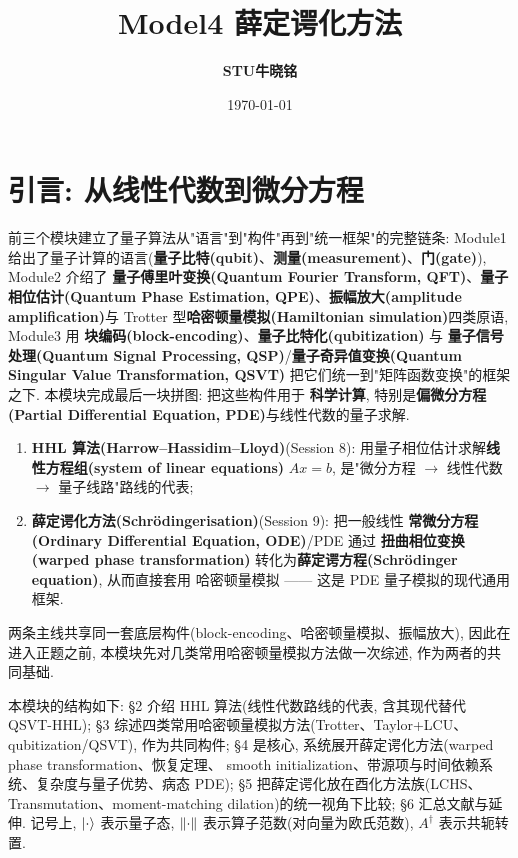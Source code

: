 \documentclass[utf8]{article} %
\title{\textbf{Model4 薛定谔化方法}}
\date{\today}
\author{\textbf{STU\quad 牛晓铭}}
\numberwithin{equation}{section}   %
\newtheorem{Note}{\hskip 2em {\color{red} 注}}[subsection]
\begin{document}
  
\maketitle
\renewcommand{\contentsname}{} 
\tableofcontents
\thispagestyle{empty}
	
\newpage
\setcounter{page}{1}
\section{引言: 从线性代数到微分方程}

前三个模块建立了量子算法从"语言"到"构件"再到"统一框架"的完整链条:
Module1 给出了量子计算的语言(\textbf{量子比特(qubit)}、\textbf{测量(measurement)}、\textbf{门(gate)}), Module2 介绍了 \textbf{量子傅里叶变换(Quantum Fourier Transform, QFT)}、\textbf{量子相位估计(Quantum Phase Estimation, QPE)}、\textbf{振幅放大(amplitude amplification)}与
Trotter 型\textbf{哈密顿量模拟(Hamiltonian simulation)}四类原语, Module3 用 \textbf{块编码(block-encoding)}、\textbf{量子比特化(qubitization)} 与 \textbf{量子信号处理(Quantum Signal Processing, QSP)}/\textbf{量子奇异值变换(Quantum Singular Value Transformation, QSVT)}
把它们统一到"矩阵函数变换"的框架之下. 本模块完成最后一块拼图: 把这些构件用于
\textbf{科学计算}, 特别是\textbf{偏微分方程(Partial Differential Equation, PDE)}与线性代数的量子求解.

\begin{Note}[两条主线]
    \begin{enumerate}
        \item \textbf{HHL 算法(Harrow--Hassidim--Lloyd)}(Session 8): 用量子相位估计求解\textbf{线性方程组(system of linear equations)} $Ax = b$,
        是"微分方程 $\to$ 线性代数 $\to$ 量子线路"路线的代表;
        \item \textbf{薛定谔化方法(Schrödingerisation)}(Session 9): 把一般线性 \textbf{常微分方程(Ordinary Differential Equation, ODE)}/PDE 通过
        \textbf{扭曲相位变换(warped phase transformation)} 转化为\textbf{薛定谔方程(Schrödinger equation)}, 从而直接套用
        哈密顿量模拟 —— 这是 PDE 量子模拟的现代通用框架.
    \end{enumerate}
    两条主线共享同一套底层构件(block-encoding、哈密顿量模拟、振幅放大),
    因此在进入正题之前, 本模块先对几类常用哈密顿量模拟方法做一次综述, 作为两者的共同基础.
\end{Note}

本模块的结构如下: §2 介绍 HHL 算法(线性代数路线的代表, 含其现代替代 QSVT-HHL);
§3 综述四类常用哈密顿量模拟方法(Trotter、Taylor+LCU、qubitization/QSVT), 作为共同构件;
§4 是核心, 系统展开薛定谔化方法(warped phase transformation、恢复定理、
smooth initialization、带源项与时间依赖系统、复杂度与量子优势、病态 PDE);
§5 把薛定谔化放在酉化方法族(LCHS、Transmutation、moment-matching dilation)的统一视角下比较;
§6 汇总文献与延伸. 记号上, $\ket{\cdot}$ 表示量子态, $\norm{\cdot}$ 表示算子范数(对向量为欧氏范数),
$A^\dagger$ 表示共轭转置.
\end{document}
